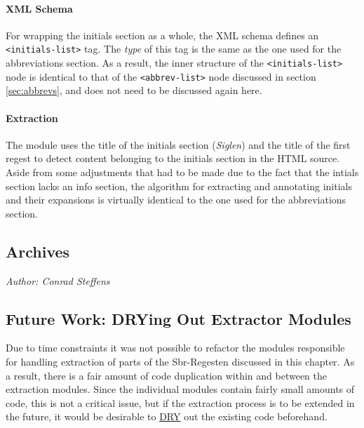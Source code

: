 \paragraph{XML Schema}

For wrapping the initials section as a whole, the XML schema defines
an \texttt{<initials-list>} tag. The \emph{type} of this tag is the
same as the one used for the abbreviations section. As a result, the
inner structure of the \texttt{<initials-list>} node is identical to
that of the \texttt{<abbrev-list>} node discussed in section
\ref{sec:abbrevs}, and does not need to be discussed again here.

\paragraph{Extraction}

The \texttt{} module uses the title of the initials section
(\emph{Siglen}) and the title of the first regest to detect content
belonging to the initials section in the HTML source. Aside from some
adjustments that had to be made due to the fact that the intials
section lacks an info section, the algorithm for extracting and
annotating initials and their expansions is virtually identical to the
one used for the abbreviations section.

\subsection{Archives}
\label{sec:archives}

\emph{Author: Conrad Steffens} \\

\subsection{Future Work: DRYing Out Extractor Modules}
\label{sec:future-work-other}

Due to time constraints it was not possible to refactor the modules
responsible for handling extraction of parts of the Sbr-Regesten
discussed in this chapter. As a result, there is a fair amount of code
duplication within and between the extraction modules. Since the
individual modules contain fairly small amounts of code, this is not a
critical issue, but if the extraction process is to be extended in the
future, it would be desirable to
\href{https://en.wikipedia.org/wiki/Don't_repeat_yourself}{DRY} out
the existing code beforehand.

